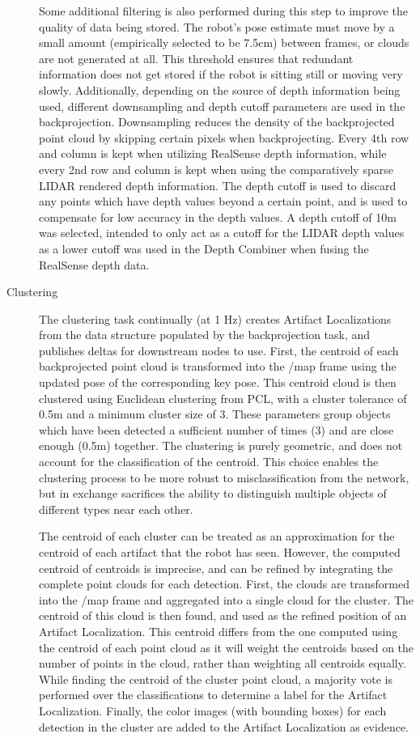 \begin{description}
	Some additional filtering is also performed during this step to improve the quality of data being stored. The robot's pose estimate must move by a small amount (empirically selected to be 7.5cm) between frames, or clouds are not generated at all. This threshold ensures that redundant information does not get stored if the robot is sitting still or moving very slowly. Additionally, depending on the source of depth information being used, different downsampling and depth cutoff parameters are used in the backprojection. Downsampling reduces the density of the backprojected point cloud by skipping certain pixels when backprojecting. Every 4th row and column is kept when utilizing RealSense depth information, while every 2nd row and column is kept when using the comparatively sparse LIDAR rendered depth information. The depth cutoff is used to discard any points which have depth values beyond a certain point, and is used to compensate for low accuracy in the depth values. A depth cutoff of 10m was selected, intended to only act as a cutoff for the LIDAR depth values as a lower cutoff was used in the Depth Combiner when fusing the RealSense depth data.
	
	\item[Clustering] The clustering task continually (at 1 Hz) creates Artifact Localizations from the data structure populated by the backprojection task, and publishes deltas for downstream nodes to use. First, the centroid of each backprojected point cloud is transformed into the /map frame using the updated pose of the corresponding key pose. This centroid cloud is then clustered using Euclidean clustering from PCL, with a cluster tolerance of 0.5m and a minimum cluster size of 3. These parameters group objects which have been detected a sufficient number of times (3) and are close enough (0.5m) together. The clustering is purely geometric, and does not account for the classification of the centroid. This choice enables the clustering process to be more robust to misclassification from the network, but in exchange sacrifices the ability to distinguish multiple objects of different types near each other.
	
	The centroid of each cluster can be treated as an approximation for the centroid of each artifact that the robot has seen. However, the computed centroid of centroids is imprecise, and can be refined by integrating the complete point clouds for each detection. First, the clouds are transformed into the /map frame and aggregated into a single cloud for the cluster. The centroid of this cloud is then found, and used as the refined position of an Artifact Localization. This centroid differs from the one computed using the centroid of each point cloud as it will weight the centroids based on the number of points in the cloud, rather than weighting all centroids equally. While finding the centroid of the cluster point cloud, a majority vote is performed over the classifications to determine a label for the Artifact Localization. Finally, the color images (with bounding boxes) for each detection in the cluster are added to the Artifact Localization as evidence.
	

\end{description}
